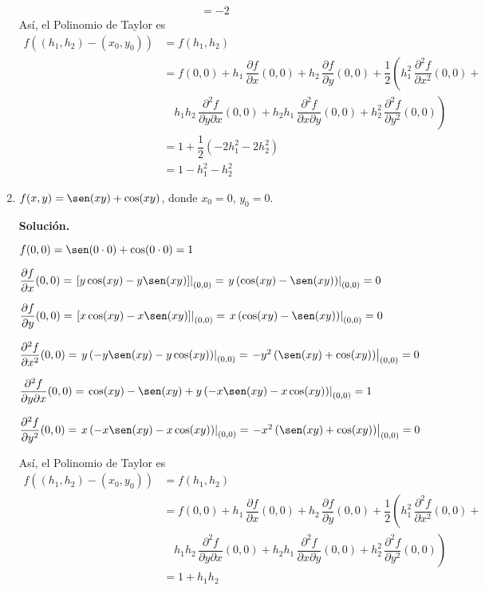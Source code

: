\documentclass[fleqn, 12pt]{article}
\newcommand{\derivadaparcial}[2]{\dfrac{\partial {#1}}{\partial {#2}}}
\newcommand{\derivadaparcialn}[3]{\dfrac{\partial^{#3} {#1}}{\partial {#2}^{#3}}}
\newcommand{\derivadaparcialnd}[3]{\dfrac{\partial^{2} {#1}}{\partial {#3} \partial {#2}}}
\begin{document}
\begin{enumerate}
\begin{align*}
            &= -2
        \end{align*}
        Así, el Polinomio de Taylor es
        \begin{align*}
            f((h_1, h_2) - (x_0, y_0)) &= f(h_1, h_2) \\
            &= f(0,0) + h_1 \, \derivadaparcial{f}{x} (0,0) + h_2 \, \derivadaparcial{f}{y} (0,0) + \dfrac{1}{2} \left( h_1^2 \, \derivadaparcialn{f}{x}{2} (0,0) \right. + \\
            & \quad \left. h_1 h_2 \, \derivadaparcialnd{f}{x}{y} (0,0) + h_2 h_1 \, \derivadaparcialnd{f}{y}{x} (0,0) + h_2^2 \, \derivadaparcialn{f}{y}{2} (0,0) \right) \\
            &= 1 + \dfrac{1}{2} \left( -2h_1^2 - 2h_2^2 \right)  \\
            &= 1 - h_1^2 - h_2^2
        \end{align*}

        \item $ f(x,y) = \sen (xy) + \cos (xy) $, donde $ x_0 = 0 $, $ y_0 = 0 $.
        
        \textbf{Solución.}

        $ f(0,0) = \sen (0 \cdot 0) + \cos (0 \cdot 0) = 1 $

        $ \derivadaparcial{f}{x} (0,0) = \left. \left[ y \cos (xy) - y \sen (xy) \right] \right|_{(0,0)} = \left. y \left( \cos (xy) - \sen (xy) \right) \right|_{(0,0)} = 0 $

        $ \derivadaparcial{f}{y} (0,0) = \left. \left[ x \cos (xy) - x \sen (xy) \right] \right|_{(0,0)} = \left. x \left( \cos (xy) - \sen (xy) \right) \right|_{(0,0)} = 0 $

        $ \derivadaparcialn{f}{x}{2} (0,0) = \left. y \left( -y \sen (xy) - y \cos (xy) \right) \right|_{(0,0)} = \left. -y^2 \left( \sen (xy) + \cos (xy) \right) \right|_{(0,0)} = 0 $
        
        $ \derivadaparcialnd{f}{x}{y} (0,0) = \left. \cos (xy) - \sen (xy) + y \left( - x \sen (xy) - x \cos (xy) \right) \right|_{(0,0)} = 1 $
        
        $ \derivadaparcialn{f}{y}{2} (0,0) = \left. x \left( -x \sen (xy) - x \cos (xy) \right) \right|_{(0,0)} = \left. -x^2 \left( \sen (xy) + \cos (xy) \right) \right|_{(0,0)} = 0 $

        Así, el Polinomio de Taylor es
        \begin{align*}
            f((h_1, h_2) - (x_0, y_0)) &= f(h_1, h_2) \\
            &= f(0,0) + h_1 \, \derivadaparcial{f}{x} (0,0) + h_2 \, \derivadaparcial{f}{y} (0,0) + \dfrac{1}{2} \left( h_1^2 \, \derivadaparcialn{f}{x}{2} (0,0) \right. + \\
            & \quad \left. h_1 h_2 \, \derivadaparcialnd{f}{x}{y} (0,0) + h_2 h_1 \, \derivadaparcialnd{f}{y}{x} (0,0) + h_2^2 \, \derivadaparcialn{f}{y}{2} (0,0) \right) \\
            &= 1 + h_1 h_2
        \end{align*}


\end{enumerate}
\end{document}
